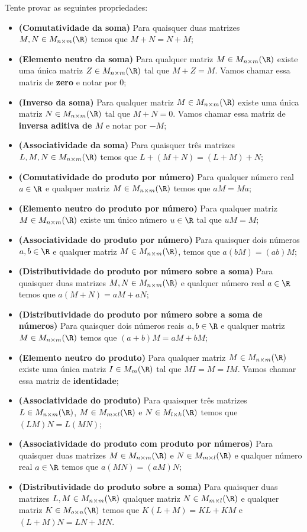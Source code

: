 \begin{exerc}
	Tente provar as seguintes propriedades:
	\begin{itemize}
		\item[] \textbf{(Comutatividade da soma)} Para quaisquer duas matrizes $M,N\in M_{n\times m}(\R)$ temos que $M+N=N+M$;
		\item[] \textbf{(Elemento neutro da soma)} Para qualquer matriz $M\in M_{n\times m}(\R)$ existe uma única matriz $Z\in M_{n\times m}(\R)$ tal que $M+Z=M$. Vamos chamar essa matriz de \textbf{zero} e notar por 0;
		\item[] \textbf{(Inverso da soma)} Para qualquer matriz $M\in M_{n\times m}(\R)$ existe uma única matriz $N\in M_{n\times m}(\R)$ tal que $M+N=0$. Vamos chamar essa matriz de \textbf{inversa  aditiva de $M$} e notar por $-M$;
		\item[] \textbf{(Associatividade da soma) }Para quaisquer três matrizes $L,M,N\in M_{n\times m}(\R)$ temos que $L+(M+N)=(L+M)+N$;
		\item[] \textbf{(Comutatividade do produto por número) }Para qualquer número real $a\in \R$ e qualquer matriz $M\in M_{n\times m}(\R)$ temos que $aM=Ma$;
		\item[] \textbf{(Elemento neutro do produto por número)} Para qualquer matriz $M\in M_{n\times m}(\R)$ existe um único número $u\in \R$ tal que $uM=M$; 
		\item[] \textbf{(Associatividade do produto por número)} Para quaisquer dois números $a,b\in \R$ e qualquer matriz $M\in M_{n\times m}(\R)$, temos que $a(bM)=(ab)M$;
		\item[] \textbf{(Distributividade do produto por número sobre a soma)} Para quaisquer duas matrizes $M,N\in M_{n\times m}(\R)$ e qualquer número real $a\in \R$ temos que $a(M+N)=aM+aN$;
		\item[] \textbf{(Distributividade do produto por número sobre a soma de números)} Para quaisquer dois números reais $a,b\in \R$ e qualquer matriz $M\in M_{n\times m}(\R)$ temos que $(a+b)M=aM+bM$;
		\item[] \textbf{(Elemento neutro do produto)} Para qualquer matriz $M\in M_{n\times m}(\R)$ existe uma única matriz $I\in M_m(\R)$ tal que $MI=M=IM$. Vamos chamar essa matriz de \textbf{identidade};
		\item[] \textbf{(Associatividade do produto)} Para quaisquer três matrizes $L\in M_{n\times m}(\R)$, $M\in M_{m\times l}(\R)$ e $N\in M_{l\times k}(\R)$ temos que $(LM)N=L(MN)$;
		\item[] \textbf{(Associatividade do produto com produto por números)} Para quaisquer duas matrizes $M\in M_{n\times m}(\R)$ e $N\in M_{m\times l}(\R)$ e qualquer número real $a\in \R$ temos que $a(MN)=(aM)N$;
		\item[] \textbf{(Distributividade do produto sobre a soma)} Para quaisquer duas matrizes $L,M\in M_{n\times m}(\R)$ qualquer matriz $N\in M_{m\times l}(\R)$ e qualquer matriz $K\in M_{o\times n}(\R)$ temos que $K(L+M)=KL+KM$ e $(L+M)N=LN+MN$.
	\end{itemize}
\end{exerc}
\pagebreak

